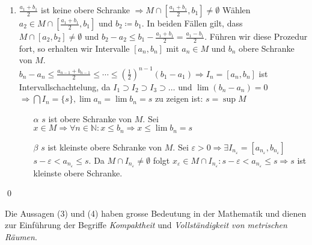 \documentclass[ngerman,titlepage,twoside, parskip=half*]{scrreprt}
\newcommand*{\N}{\mathbb{N}}
\theoremstyle{plain}
\theoremstyle{definition}
\theoremstyle{remark}
\begin{document}
\begin{itemize}
\begin{enumerate}[1. F{a}ll]
\begin{enumerate}[{2}.1. F{a}ll]
	\item $\frac{a_1+b_1}{2}$ ist keine obere Schranke $\Rightarrow M \cap [\frac{a_1+b_1}{2},b_1]\neq \emptyset$
	  Wählen $a_2 \in M \cap [\frac{a_1+b_1}{2},b_1]$ und $b_2\coloneqq b_1$. In beiden Fällen gilt, dass $M\cap [a_2,b_2]
	  \neq \emptyset$ und $b_2-a_2\leq b_1-\frac{a_1+b_1}{2}=\frac{a_1-b_1}{2}$. Führen wir diese Prozedur fort, so
	  erhalten wir Intervalle $[a_n,b_n]$ mit $a_n \in M$ und $b_n$ obere Schranke von $M$.\\
	  $b_n-a_n\leq \frac{a_{n-1}+b_{n-1}}{2}\leq \cdots \leq (\frac{1}{2})^{n-1}(b_1-a_1)\Rightarrow I_n=[a_n,b_n]$
	  ist Intervallschachtelung, da $I_1\supset I_2\supset I_3\supset \ldots$ und $\lim (b_n-a_n)=0$\\
	  $\Rightarrow \bigcap I_n =\{s\}, \lim a_n=\lim b_n=s$ zu zeigen ist: $s=\sup M$
	  \begin{itemize}
	    \item[$\alpha$] $s$ ist obere Schranke von $M$. Sei $x \in M \Rightarrow \forall n \in \N \colon x \leq b_n
	      \Rightarrow x \leq \lim b_n =s$
	    \item[$\beta$] $s$ ist kleinste obere Schranke von $M$. Sei $\varepsilon >0\Rightarrow \exists I_{n_{\varepsilon}}=
	      [a_{n_{\varepsilon}},b_{n_{\varepsilon}}]$\\
	      $s-\varepsilon <a_{n_{\varepsilon}}\leq s$. Da $M\cap I_{n_{\varepsilon}}\neq \emptyset$ folgt $x_{\varepsilon}
	      \in M \cap I_{n_{\varepsilon}}\colon s-\varepsilon<a_{n_{\varepsilon}}\leq s\Rightarrow s$ ist kleinste obere
	      Schranke.
	  \end{itemize}
      \end{enumerate}
    \end{enumerate}
\end{itemize}
\qed

Die Aussagen (3) und (4) haben grosse Bedeutung in der Mathematik und dienen zur Einführung der Begriffe
\emph{Kompaktheit} und \emph{Vollständigkeit von metrischen Räumen}.
\end{document}
